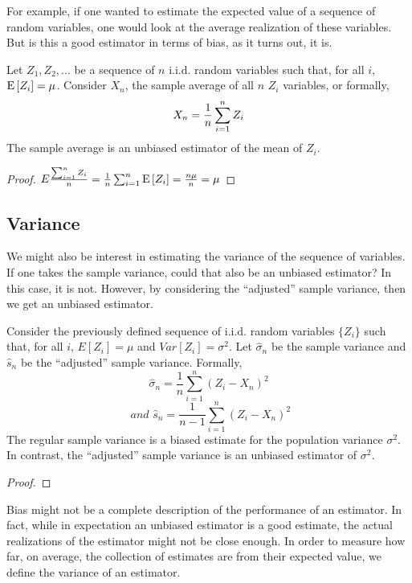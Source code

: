 For example, if one wanted to estimate the expected value of a sequence of random variables, one would look at the average realization of these variables. But is this a good estimator in terms of bias, as it turns out, it is.

\begin{proposition} 
Let $Z_1, Z_2, ...$ be a sequence of $n$ i.i.d. random variables such that, for all $i$, $\operatorname{E}\left[Z_i\right] = \mu$. Consider $X_n$, the sample average of all $n$ $Z_i$ variables, or formally, $$X_n = \frac{1}{n} \sum_{i=1}^{n} Z_i $$
The sample average is an unbiased estimator of the mean of $Z_i$.
\end{proposition}
\begin{proof}
$E{\frac{\sum_{i=1}^{n} Z_i}{n}} = \frac{1}{n}\sum_{i=1}^{n} \operatorname{E}\left[Z_i\right] = \frac{n\mu}{n} = \mu $
\end{proof}

\subsection{Variance}

We might also be interest in estimating the variance of the sequence of variables. If one takes the sample variance, could that also be an unbiased estimator? In this case, it is not. However, by considering the ``adjusted'' sample variance, then we get an unbiased estimator.

\begin{proposition}  
Consider the previously defined sequence of i.i.d. random variables $\{Z_i\}$ such that, for all $i$, $E[Z_i] = \mu$ and $Var[Z_i] = \sigma^2$. Let $\hat{\sigma}_n$ be the sample variance and $\hat s_n$ be the ``adjusted'' sample variance. Formally, $$\hat\sigma_n = \frac{1}{n}\sum_{i=1}^{n}(Z_i - X_n)^2 $$ $$ \textit{ and } \hat s_n = \frac{1}{n-1}\sum_{i=1}^{n}(Z_i - X_n)^2 $$
The regular sample variance is a biased estimate for the population variance $\sigma^2$. In contrast, the ``adjusted'' sample variance is an unbiased estimator of $\sigma^2$.
\end{proposition}

\begin{proof}

\end{proof}

Bias might not be a complete description of the performance of an estimator. In fact, while in expectation an unbiased estimator is a good estimate, the actual realizations of the estimator might not be close enough. In order to measure how far, on average, the collection of estimates are from their expected value, we define the variance of an estimator.


